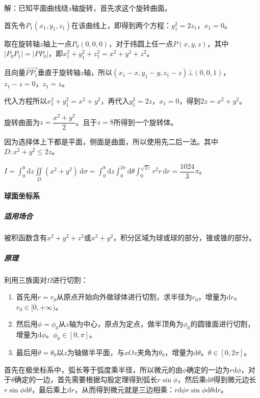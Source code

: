\documentclass[UTF8, 12pt]{ctexart}
\begin{document}
解：已知平面曲线绕$z$轴旋转，首先求这个旋转曲面。

首先令$P_1(x_1,y_1,z_1)$在该曲线上，即得到两个方程：$y_1^2=2z_1$，$x_1=0$。

取在旋转轴$z$轴上一点$P_0(0,0,0)$，对于纬圆上任一点$P(x,y,z)$，其中$\vert P_0P_1\vert=\vert PP_0\vert$，即$x_1^2+y_1^2+z_1^2=x^2+y^2+z^2$。

且向量$\overrightarrow{PP_1}$垂直于旋转轴$z$轴，所以$(x_1-x,y_1-y,z_1-z)\bot(0,0,1)$，$z_1-z=0$，$z_1=z$。

代入方程所以$x_1^2+y_1^2=x^2+y^2$，再代入$y_1^2=2z$，$x_1=0$，得到$2z=x^2+y^2$。

旋转曲面为$z=\dfrac{x^2+y^2}{2}$。且于$z=8$所得到一个旋转体。

因为选择体上下都是平面，侧面是曲面，所以使用先二后一法。其中$D:x^2+y^2\leqslant2z$。

$I=\int_0^8\textrm{d}z\iint\limits_D(x^2+y^2)\,\textrm{d}\sigma=\int_0^8\textrm{d}z\int_0^{2\pi}\textrm{d}\theta\int_0^{\sqrt{2z}}r^2r\,\textrm{d}r=\dfrac{1024}{3}\pi$。

\paragraph{球面坐标系} \leavevmode \medskip

\subparagraph{适用场合} \leavevmode \medskip

被积函数含有$x^2+y^2+z^2$或$x^2+y^2$，积分区域为球或球的部分，锥或锥的部分。

\subparagraph{原理} \leavevmode \medskip

利用三族面对$\Omega$进行切割：

\begin{enumerate}
    \item 首先用$r=r_0$从原点开始向外做球体进行切割，求半径为$r_0$，增量为$\textrm{d}r$。$r_0\in[0,+\infty)$。
    \item 然后用$\phi=\phi_0$从$z$轴为中心，原点为定点，做半顶角为$\phi_0$的圆锥面进行切割，增量为$\textrm{d}\phi$。$\phi_0\in[0,\pi]$。
    \item 最后用$\theta=\theta_0$以$z$为轴做半平面，与$xOz$夹角为$\theta_0$，增量为$\textrm{d}\theta$。$\theta\in[0,2\pi]$。
\end{enumerate}

首先在极坐标系中，弧长等于弧度乘半径，所以微元的由$\phi$确定的一边为$r\textrm{d}\phi$，对于$\theta$确定的一边，首先需要根据勾股定理得到弧长$r\sin\phi$，然后乘$\textrm{d}\theta$得到微元边长$r\sin\phi\textrm{d}\theta$，最后乘上$\textrm{d}r$，从而得到微元就是三边相乘：$r\textrm{d}\phi r\sin\phi\textrm{d}\theta\textrm{d}r$。
\end{document}
